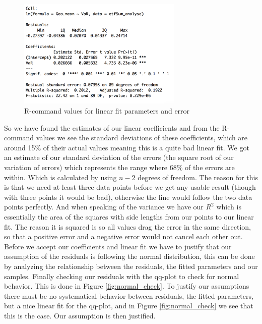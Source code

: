 \documentclass{article}
\begin{document}
\begin{figure}[h!]
\centering
\includegraphics[width=0.7\textwidth]{fig/lm.png}
\caption{R-command values for linear fit parameters and error}
\label{fig:Rcode_lm}
\end{figure}

So we have found the estimates of our linear coefficients and from the R-command values we see the standard deviations of these coefficients, which are around 15\% of their actual values meaning this is a quite bad linear fit. We got an estimate of our standard deviation of the errors (the square root of our variation of errors) which represents the range where 68\% of the errors are within. Which is calculated by using $n-2$ degrees of freedom. The reason for this is that we need at least three data points before we get any usable result (though with three points it would be bad), otherwise the line would follow the two data points perfectly. And when speaking of the variance we have our $R^2$ which is essentially the area of the squares with side lengths from our points to our linear fit. The reason it is squared is so all values drag the error in the same direction, so that a positive error and a negative error would not cancel each other out. \\

Before we accept our coefficients and linear fit we have to justify that our assumption of the residuals is following the normal distribution, this can be done by analyzing the relationship between the residuals, the fitted parameters and our samples. Finally checking our residuals with the qq-plot to check for normal behavior. This is done in Figure \ref{fig:normal_check}. To justify our assumptions there must be no systematical behavior between residuals, the fitted parameters, but a nice linear fit for the qq-plot, and in Figure \ref{fig:normal_check} we see that this is the case. Our assumption is then justified. 
\end{document}
